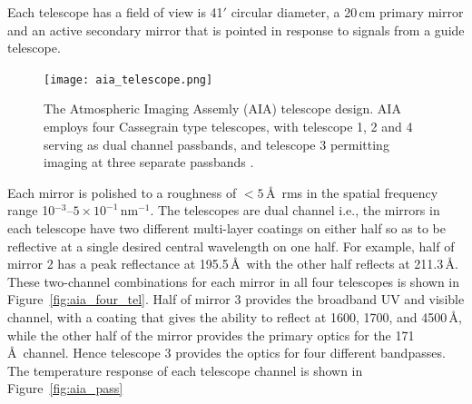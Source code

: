 Each telescope has a field of view is 41$'$ circular diameter, a 20\,cm primary mirror and an active secondary mirror that is pointed in response to signals from a guide telescope. 
\begin{figure}[!t]
\begin{center}
\texttt{[image: aia\_telescope.png]}
\caption[The AIA telescope design]{The Atmospheric Imaging Assemly (AIA) telescope design. AIA employs four Cassegrain type telescopes, with telescope 1, 2 and 4 serving as dual channel passbands, and telescope 3 permitting imaging at three separate passbands \citep{lemen2012}.}
\end{center}
\end{figure}
Each mirror is polished to a roughness of $<5$\,\AA~rms in the spatial frequency range 10$^{-3}$--$5\times10^{-1}$\,nm$^{-1}$. The telescopes are dual channel i.e., the mirrors in each telescope have two different multi-layer coatings on either half so as to be reflective at a single desired central wavelength on one half. For example, half of mirror 2 has a peak reflectance at 195.5\,\AA~with the other half reflects at 211.3\,\AA. These two-channel combinations for each mirror in all four telescopes is shown in Figure~\ref{fig:aia_four_tel}. Half of mirror 3 provides the broadband UV and visible channel, with a coating that gives the ability to reflect at 1600, 1700, and 4500\,\AA, while the other half of the mirror provides the primary optics for the 171\,\AA~channel. Hence telescope 3 provides the optics for four different bandpasses. The temperature response of each telescope channel is shown in Figure~\ref{fig:aia_pass}

